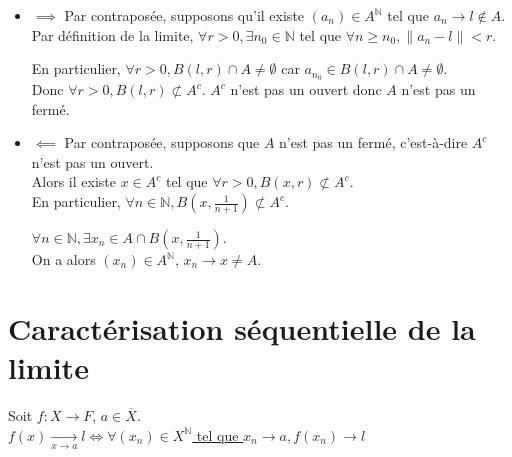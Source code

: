 \documentclass[]{article}
\begin{document}
\begin{itemize}
    \item $\boxed{\implies}$
    Par contraposée, supposons qu'il existe $(a_n) \in A^{\mathbb{N}}$ tel que $a_n \longrightarrow l \not \in A$. \\

    Par définition de la limite, $\forall r > 0, \exists n_0 \in \mathbb{N}$ tel que $\forall n \geq n_0, \|a_n - l\| < r$. 

    En particulier, $\forall r > 0, B(l, r) \cap A \neq \emptyset$ car $a_{n_0} \in B(l, r) \cap A \neq \emptyset$. \\
    
    Donc $\forall r > 0, B(l, r) \not \subset A^c$. $A^c$ n'est pas un ouvert donc $A$ n'est pas un fermé. \\

    \item $\boxed{\impliedby}$
    Par contraposée, supposons que $A$ n'est pas un fermé, c'est-à-dire $A^c$ n'est pas un ouvert. \\

    Alors il existe $x \in A^c$ tel que $\forall r > 0, B(x, r) \not \subset A^c$. \\

    En particulier, $\forall n \in \mathbb{N}, B(x, \frac{1}{n+1}) \not \subset A^c$. 
    
    $\forall n \in \mathbb{N}, \exists x_n \in A \cap B(x, \frac{1}{n+1})$. \\

    On a alors $(x_n) \in A^{\mathbb{N}}$, $x_n \longrightarrow x \neq A$.

\end{itemize}

\section{Caractérisation séquentielle de la limite}

Soit $f:X \rightarrow F$, $a \in \overline{X}$. \\

\underline{$f(x) \underset{x \rightarrow a}{\longrightarrow} l \iff \forall (x_n) \in X^{\mathbb{N}}$ tel que $x_n \longrightarrow a, f(x_n) \longrightarrow l$}
\end{document}
